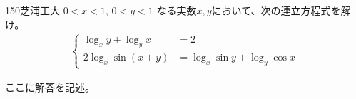 \begin{thm}{150}{}{芝浦工大}
 $0<x<1$, $0<y<1$ なる実数$x, y$において、次の連立方程式を解け。
 \begin{align*}
  \left\{
  \begin{aligned}
   \log_x y+\log_y x &=2 \\
   2\log_x \sin(x+y) &= \log_x \sin y+\log_y \cos x
  \end{aligned}
  \right.
 \end{align*}
\end{thm}

ここに解答を記述。